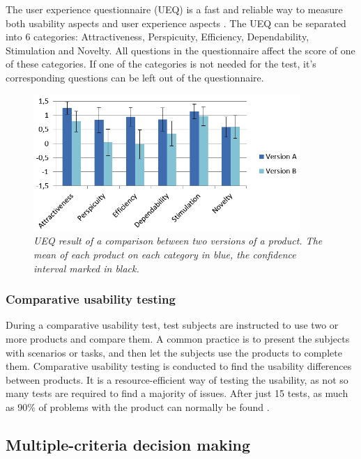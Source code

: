 The user experience questionnaire (UEQ) is a fast and reliable way to measure both usability aspects and user experience aspects \cite{UEQOnline}. 
The UEQ can be separated into 6 categories: Attractiveness, Perspicuity, Efficiency, Dependability, Stimulation and Novelty. 
All questions in the questionnaire affect the score of one of these categories. 
If one of the categories is not needed for the test, it’s corresponding questions can be left out of the questionnaire. 

\begin{figure}[ht]
	\centering 
    \includegraphics[width=0.9\textwidth]{img/comparative_test_ueq.png}
	\hfill
	\caption{\textit{UEQ result of a comparison between two versions of a product. The mean of each product on each category in blue, the confidence interval marked in black. \cite{SchreppHinderksYhomaschewski2014} }}
\end{figure}

\newpage

\subsubsection{ Comparative usability testing}

During a comparative usability test, test subjects are instructed to use two or more products and compare them. A common practice is to present the subjects with scenarios or tasks, and then let the subjects use the products to complete them. 
Comparative usability testing is conducted to find the usability differences between products. It is a resource-efficient way of testing the usability, as not so many tests are required to find a majority of issues. After just 15 tests, as much as 90\% of problems with the product can normally be found \cite{SixMacefield2016}. 

 \subsection{Multiple-criteria decision making}
 

